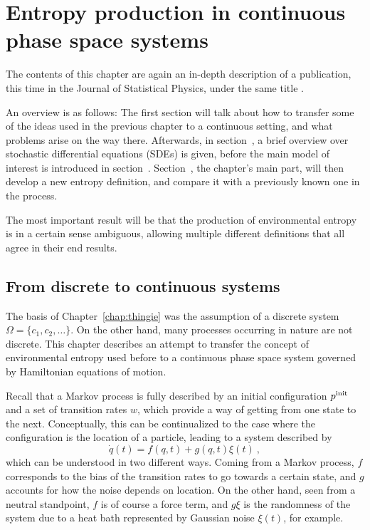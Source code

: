 \chapter{Entropy production in continuous phase space systems}
\label{chap:flow}

The contents of this chapter are again an in-depth description of a publication, this time in the Journal of Statistical Physics, under the same title \cite{flow-paper}.

An overview is as follows: The first section will talk about how to transfer some of the ideas used in the previous chapter to a continuous setting, and what problems arise on the way there. Afterwards, in section~, a brief overview over stochastic differential equations (SDEs) is given, before the main model of interest is introduced in section~. Section~, the chapter's main part, will then develop a new entropy definition, and compare it with a previously known one in the process.

The most important result will be that the production of environmental entropy is in a certain sense ambiguous, allowing multiple different definitions that all agree in their end results.


\section{From discrete to continuous systems}
\label{sec:discrete to continuous}

The basis of Chapter~\ref{chap:thingie} was the assumption of a discrete system \(\Omega = \{c_1, c_2, \ldots\}\). On the other hand, many processes occurring in nature are not discrete. This chapter describes an attempt to transfer the concept of environmental entropy used before to a continuous phase space system governed by Hamiltonian equations of motion.

Recall that a Markov process is fully described by an initial configuration \(p^{\text{init}}\) and a set of transition rates \(w\), which provide a way of getting from one state to the next. Conceptually, this can be continualized to the case where the configuration is the location of a particle, leading to a system described by
%
\begin{equation}
	\label{eqn:overdamped}
	\dot q(t) = f(q,t) + g(q,t)\xi(t) ~,
\end{equation}
%
which can be understood in two different ways. Coming from a Markov process, \(f\) corresponds to the bias of the transition rates to go towards a certain state, and \(g\) accounts for how the noise depends on location. On the other hand, seen from a neutral standpoint, \(f\) is of course a force term, and \(g\xi\) is the randomness of the system due to a heat bath represented by Gaussian noise \(\xi(t)\), for example.

